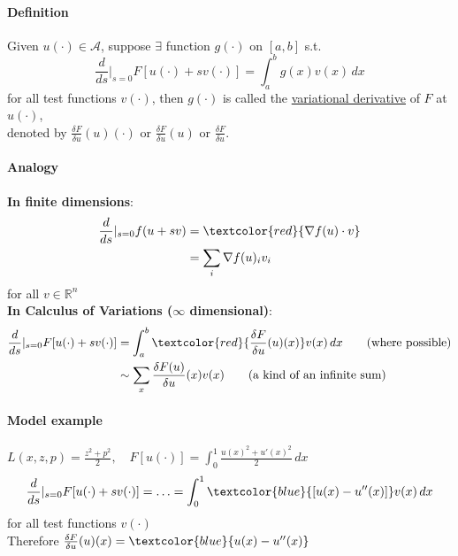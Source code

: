 \documentclass[11pt]{article}
\newcommand{\tb}[1]{\textbf{#1}}
\newcommand{\mc}[1]{\mathcal{#1}}
\newcommand{\real}[0]{\mathbb{R}}
\newcommand{\under}[1]{\underline{#1}}
\begin{document}
\paragraph{Definition}
Given $u(\cdot) \in \mc{A}$, suppose $\exists$ function $g(\cdot)$ on $[a,b]$ s.t.
$$\frac{d}{ds}|_{s=0} F[u(\cdot) + sv(\cdot)] = \int_a^b g(x) v(x) \, dx$$ for all test functions $v(\cdot)$, then $g(\cdot)$ is called the \under{variational derivative} of $F$ at $u(\cdot)$, \\denoted by $\frac{\delta F}{\delta u}(u)(\cdot)$ or $\frac{\delta F}{\delta u}(u)$ or $\frac{\delta F}{\delta u}$.

\paragraph{Analogy}
\tb{In finite dimensions}:
\begin{align}
\frac{d}{ds}|_{s=0}f(u+sv) &= \textcolor{red}{\nabla f(u)\cdot v} \\
&= \sum_i \nabla f(u)_i v_i	
\end{align}
for all $v \in \real^n$ \\
\tb{In Calculus of Variations ($\infty$ dimensional)}:
\begin{align}
	\frac{d}{ds}|_{s=0} F[u(\cdot) + sv(\cdot)] &= \int_a^b \textcolor{red}{\frac{\delta F}{\delta u}(u)(x)} v(x) \, dx \tag{where possible} \\
	&\sim \sum_x \frac{\delta F(u)}{\delta u} (x) v(x) \tag{a kind of an infinite sum}
\end{align}

\paragraph{Model example}
$L(x, z, p) = \frac{z^2 + p^2}{2}, \quad F[u(\cdot)] = \int_0^1 \frac{u(x)^2 + u'(x)^2}{2} \, dx$\\
$$\frac{d}{ds}|_{s=0} F[u(\cdot) + sv(\cdot)] = \hdots = \int_0^1 \textcolor{blue}{[u(x) - u''(x)]}v(x) \, dx$$ for all test functions $v(\cdot)$\\
Therefore 
$\frac{\delta F}{\delta u}(u)(x) = \textcolor{blue}{u(x) - u''(x)}$
\end{document}
